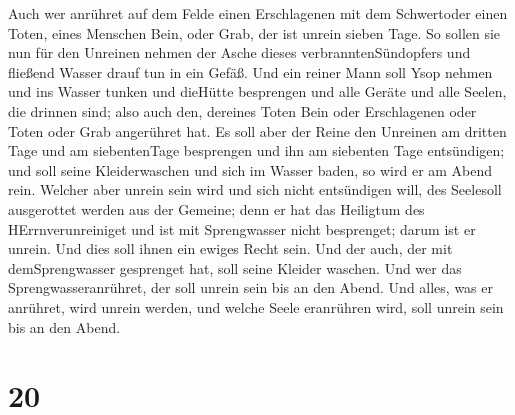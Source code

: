  Auch wer anrühret auf dem Felde einen Erschlagenen mit dem
Schwertoder einen Toten, eines Menschen Bein, oder Grab, der ist unrein
sieben Tage.  So sollen sie nun für den Unreinen nehmen der
Asche dieses verbranntenSündopfers und fließend Wasser drauf tun in ein
Gefäß.  Und ein reiner Mann soll Ysop nehmen und ins Wasser
tunken und dieHütte besprengen und alle Geräte und alle Seelen, die
drinnen sind; also auch den, dereines Toten Bein oder Erschlagenen oder
Toten oder Grab angerühret hat.  Es soll aber der Reine den
Unreinen am dritten Tage und am siebentenTage besprengen und ihn am
siebenten Tage entsündigen; und soll seine Kleiderwaschen und sich im
Wasser baden, so wird er am Abend rein.  Welcher aber
unrein sein wird und sich nicht entsündigen will, des Seelesoll
ausgerottet werden aus der Gemeine; denn er hat das Heiligtum des
HErrnverunreiniget und ist mit Sprengwasser nicht besprenget; darum ist
er unrein.  Und dies soll ihnen ein ewiges Recht sein. Und
der auch, der mit demSprengwasser gesprenget hat, soll seine Kleider
waschen. Und wer das Sprengwasseranrühret, der soll unrein sein bis an
den Abend.  Und alles, was er anrühret, wird unrein werden,
und welche Seele eranrühren wird, soll unrein sein bis an den Abend.

\hypertarget{section-19}{%
\section{20}\label{section-19}}

